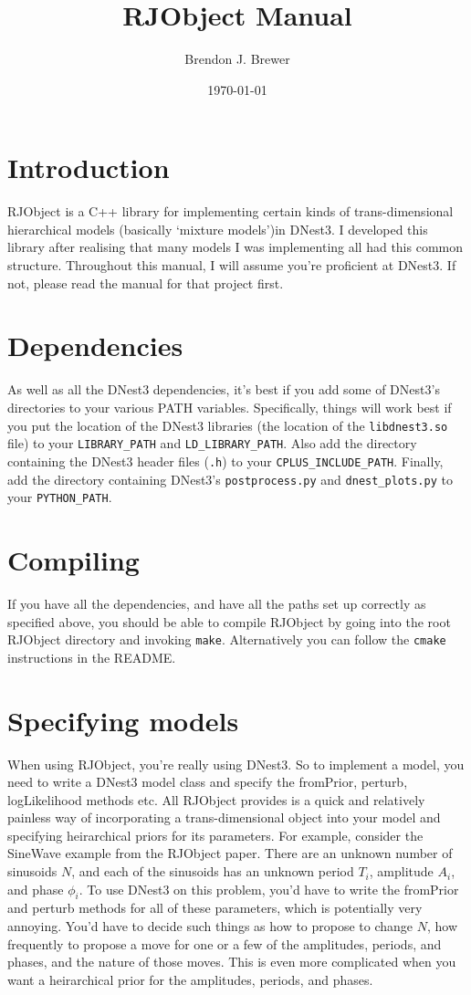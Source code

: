 \documentclass[a4paper, 11pt]{article}
\title{RJObject Manual}
\author{Brendon J. Brewer}
\date{\today}
\begin{document}
\maketitle

\section{Introduction}
RJObject is a C++ library for implementing certain kinds of trans-dimensional
hierarchical models (basically `mixture models')in DNest3. I developed this
library after realising that many models I was implementing all had this
common structure.
Throughout this manual, I will assume you're proficient at
DNest3. If not, please read the manual for that project first.

\section{Dependencies}
As well as all the DNest3 dependencies, it's best if you add some of DNest3's
directories to your various PATH variables. Specifically, things will work best
if you put the location of the DNest3 libraries (the location of
the {\tt libdnest3.so} file) to your {\tt LIBRARY\_PATH} and
{\tt LD\_LIBRARY\_PATH}. Also add the directory containing the DNest3 header
files ({\tt *.h}) to your {\tt CPLUS\_INCLUDE\_PATH}. Finally, add the
directory containing DNest3's {\tt postprocess.py} and {\tt dnest\_plots.py} to
your {\tt PYTHON\_PATH}.

\section{Compiling}
If you have all the dependencies, and have all the paths set up correctly as
specified above, you should be able to compile RJObject by going into the
root RJObject directory and invoking {\tt make}. Alternatively you can follow
the {\tt cmake} instructions in the README.

\section{Specifying models}
When using RJObject, you're really using DNest3. So to implement a model, you
need to write a DNest3 model class and specify the fromPrior, perturb,
logLikelihood methods etc. All RJObject provides is a quick and relatively
painless way of incorporating a trans-dimensional object into your model and
specifying heirarchical priors for its parameters. For example, consider
the SineWave example from the RJObject paper. There are an unknown number of
sinusoids $N$, and each of the sinusoids has an unknown period $T_i$, amplitude
$A_i$, and phase $\phi_i$. To use DNest3 on this problem, you'd have to write
the fromPrior and perturb methods for all of these parameters, which is
potentially very annoying. You'd have to decide such things as how to propose
to change $N$, how frequently to propose a move for one or a few of the
amplitudes, periods, and phases, and the nature of those moves. This is even
more complicated when you want a heirarchical prior for the amplitudes, periods,
and phases.
\end{document}
